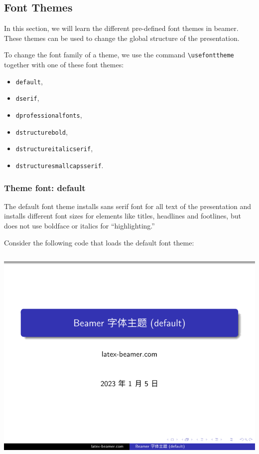 \subsection{Font Themes}

In this section, we will learn the different pre-defined font themes in beamer. These themes can be used to change the global structure of the presentation.

To change the font family of a theme, we use the command \verb|\usefonttheme| together with one of these font themes:
\begin{itemize}
  \item \verb|default|,
  \item \verb|dserif|,
  \item \verb|dprofessionalfonts|,
  \item \verb|dstructurebold|,
  \item \verb|dstructureitalicserif|,
  \item \verb|dstructuresmallcapsserif|.
\end{itemize}

\subsubsection{Theme font: {\ttfamily default}}

The default font theme installs sans serif font for all text of the presentation and installs different font sizes for elements like titles, headlines and footlines, but does not use boldface or italics for “highlighting.”

Consider the following code that loads the default font theme:

\inputminted[linenos=true]{latex}{examples/beamer/font-theme-default.tex}

\includegraphics[page=1]{examples/beamer/font-theme-default.pdf}

